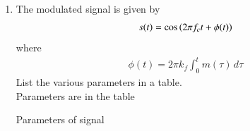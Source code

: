 \begin{enumerate}[label=\arabic*.,ref=\thesection.\theenumi]
\item The modulated signal is given by 
\begin{align}
	s(t) = \cos\left(2\pi f_c t + \phi(t)\right)
\end{align}
where
\begin{align}
	\phi(t) = 2\pi k_f \int_{0}^{t}m(\tau)\,d\tau
\end{align}
List the various parameters in a table.
\\
\solution
Parameters are in the table 
\vspace{10mm}
\begin{table}[!ht]
  \centering
  
  \caption{Parameters of signal}
  \label{tab_2}
\end{table}


\end{enumerate}
